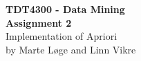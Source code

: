 \begin{titlepage}
	\begin{center}

	
		{\Huge \bf TDT4300 - Data Mining} \\[2.0cm]
		{\Huge \bf Assignment 2} \\[6.0cm]


		{\Huge Implementation of Apriori} \\[8.0cm]


		{\Large by Marte Løge and Linn Vikre} \\[1.0cm]


	\end{center}
\end{titlepage}